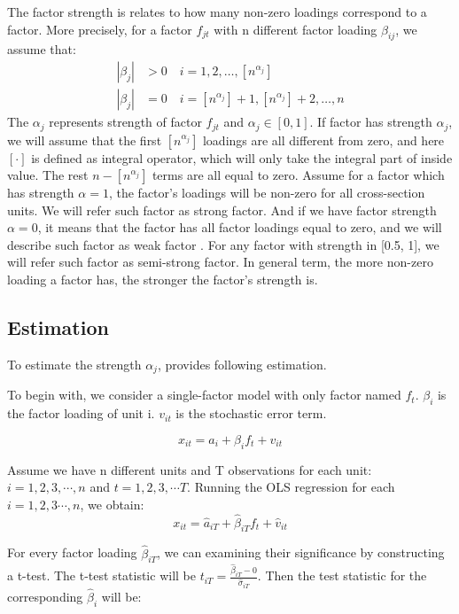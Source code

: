 \documentclass[12pt]{article}
\begin{document}
The factor strength is relates to how many non-zero loadings correspond to a factor.
More precisely, for a factor $f_{jt}$ with n different factor loading $\beta_{ij}$, we assume that:
\begin{align*}
|\beta_{j}| &> 0\quad i = 1, 2,  \dots, [n^{\alpha_j}]\\
|\beta_{j}| &= 0 \quad i = [n^{\alpha_j}] + 1, [n^{\alpha_j}] +2 ,\dots, n
\end{align*}
The $\alpha_j$ represents strength of factor $f_{jt}$ and $\alpha_j \in [0,1]$.
If factor has strength $\alpha_j$, we will assume that the first $[n^{\alpha_j}]$ loadings are all different from zero, and here $[\cdot] $  is defined as integral operator, which will only take the integral part of inside value.%
The rest $n - [n^{\alpha_j}]$ terms are all equal to zero. %
Assume for a factor which has strength $\alpha = 1$, the factor's loadings will be non-zero for all cross-section units.
We will refer such factor as strong factor.
And if we have factor strength $\alpha = 0$, it means that the factor has all factor loadings equal to zero, and we will describe such factor as weak factor \cite{Bailey2016}.
For any factor with strength in [0.5, 1], we will refer such factor as semi-strong factor.
In general term, the more non-zero loading a factor has, the stronger the factor's strength is. 

	\subsection{Estimation}\label{estimation}
To estimate the strength $\alpha_j$,  provides following estimation.

To begin with, we consider a single-factor model with only factor named $f_t$. 
 $\beta_{i}$ is the factor loading of unit i.
$v_{it}$ is the stochastic error term.

\[  x_{it} = a_{i} +  \beta_{i}f_{t} + v_{it} \tag{2} \label{estimation_model}\]

Assume we have n different units and T observations for each unit: $i = 1, 2, 3, \cdots, n$ and $t = 1,2,3, \cdots T$.
Running the OLS regression for each $i = 1,2,3\cdots, n$, we obtain:
\[   x_{it} = \hat{a}_{iT} +  \hat{\beta}_{iT}f_{t} + \hat{v}_{it}  \]

For every factor loading $\hat{\beta}_{iT}$, we can examining their significance by constructing a t-test.
The t-test statistic will be $t_{iT} = \frac{\hat{\beta}_{iT} - 0}{\hat{\sigma}_{iT}}$.  
Then the test statistic for the corresponding $\hat{\beta}_i$ will be:
\end{document}
